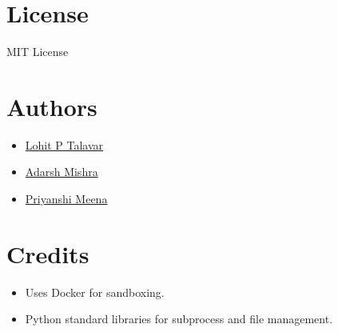 \documentclass{article}
\begin{document}
\section*{License}
MIT License

\section*{Authors}
\begin{itemize}
    \item \href{https://github.com/lohitpt252003}{Lohit P Talavar}
    \item \href{https://github.com/adarshmishra121}{Adarsh Mishra}
    \item \href{https://github.com/MeenaPriyanshi}{Priyanshi Meena}
\end{itemize}

\section*{Credits}
\begin{itemize}
    \item Uses Docker for sandboxing.
    \item Python standard libraries for subprocess and file management.
\end{itemize}
\end{document}
